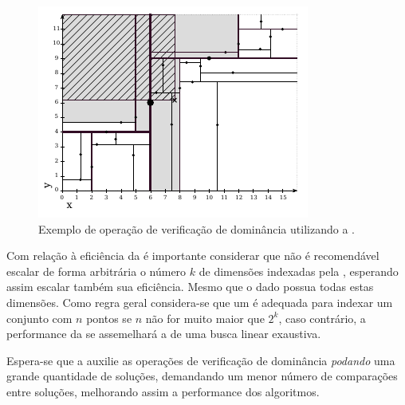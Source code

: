\begin{figure}[H]
  \centering
  \includegraphics[scale=1.7]{img/kdt/query}
  \caption{Exemplo de operação de verificação de dominância utilizando a \kdtree{}.}
  \label{fig:query}
\end{figure}

Com relação à eficiência da \kdtree{} é importante considerar que não é
recomendável escalar de forma arbitrária o número $k$ de dimensões
indexadas pela \kdtree{}, esperando assim escalar também sua eficiência.
Mesmo que o dado possua todas estas dimensões.
Como regra geral considera-se que um \kdtree{} é adequada para indexar um
conjunto com $n$ pontos se $n$ não for muito maior que $2^k$\cite{toth2004handbook},
caso contrário, a performance da \kdtree{} se assemelhará a de uma busca
linear exaustiva.

Espera-se que a \kdtree{} auxilie as operações de verificação de dominância
\emph{podando} uma grande quantidade de soluções, demandando um menor número
de comparações entre soluções, melhorando assim a performance dos algoritmos.


